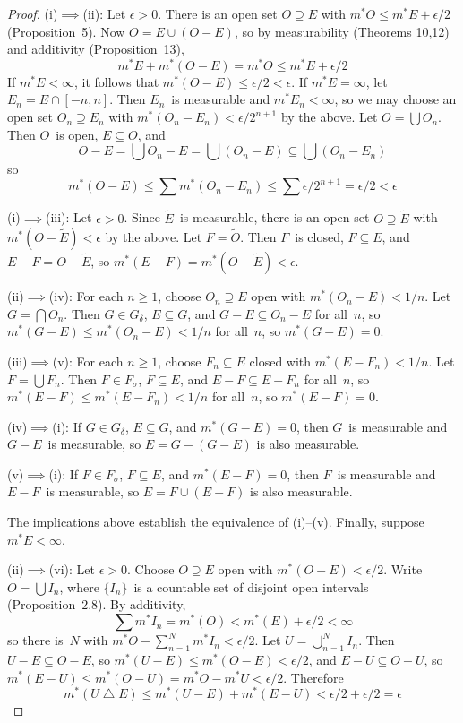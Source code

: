 \documentclass[letterpaper,12pt]{article}
\newcommand{\Gd}{G_{\delta}}
\newcommand{\Fs}{F_{\sigma}}
\newcommand{\union}{\cup}
\newcommand{\sect}{\cap}
\newcommand{\diff}{\bigtriangleup}
\newcommand{\bigunion}{\bigcup}
\newcommand{\bigsect}{\bigcap}
\newcommand{\mo}{m^*}
\newcommand{\comp}[1]{\widetilde{#1}}
\theoremstyle{plain}
\theoremstyle{definition}
\theoremstyle{remark}
\begin{document}
\begin{proof}
(i)\(\implies\)(ii): Let \(\epsilon>0\). There is an open set \(O\supseteq E\) with \(\mo O\le\mo E+\epsilon/2\) (Proposition~5). Now \(O=E\union(O-E)\), so by measurability (Theorems 10,12) and additivity (Proposition~13),
\[\mo E+\mo(O-E)=\mo O\le\mo E+\epsilon/2\]
If \(\mo E<\infty\), it follows that \(\mo(O-E)\le\epsilon/2<\epsilon\). If \(\mo E=\infty\), let \(E_n=E\sect[-n,n]\). Then \(E_n\)~is measurable and \(\mo E_n<\infty\), so we may choose an open set \(O_n\supseteq E_n\) with \(\mo(O_n-E_n)<\epsilon/2^{n+1}\) by the above. Let \(O=\bigunion O_n\). Then \(O\)~is open, \(E\subseteq O\), and
\[O-E=\bigunion O_n-E=\bigunion(O_n-E)\subseteq\bigunion(O_n-E_n)\]
so
\[\mo(O-E)\le\sum\mo(O_n-E_n)\le\sum\epsilon/2^{n+1}=\epsilon/2<\epsilon\]

(i)\(\implies\)(iii): Let \(\epsilon>0\). Since \(\comp{E}\)~is measurable, there is an open set \(O\supseteq\comp{E}\) with \(\mo(O-\comp{E})<\epsilon\) by the above. Let \(F=\comp{O}\). Then \(F\)~is closed, \(F\subseteq E\), and \(E-F=O-\comp{E}\), so \(\mo(E-F)=\mo(O-\comp{E})<\epsilon\).

(ii)\(\implies\)(iv): For each \(n\ge1\), choose \(O_n\supseteq E\) open with \(\mo(O_n-E)<1/n\). Let \(G=\bigsect O_n\). Then \(G\in\Gd\), \(E\subseteq G\), and \(G-E\subseteq O_n-E\) for all~\(n\), so \(\mo(G-E)\le\mo(O_n-E)<1/n\) for all~\(n\), so \(\mo(G-E)=0\).

(iii)\(\implies\)(v): For each \(n\ge1\), choose \(F_n\subseteq E\) closed with \(\mo(E-F_n)<1/n\). Let \(F=\bigunion F_n\). Then \(F\in\Fs\), \(F\subseteq E\), and \(E-F\subseteq E-F_n\) for all~\(n\), so \(\mo(E-F)\le\mo(E-F_n)<1/n\) for all~\(n\), so \(\mo(E-F)=0\).

(iv)\(\implies\)(i): If \(G\in\Gd\), \(E\subseteq G\), and \(\mo(G-E)=0\), then \(G\)~is measurable and \(G-E\)~is measurable, so \(E=G-(G-E)\) is also measurable.

(v)\(\implies\)(i): If \(F\in\Fs\), \(F\subseteq E\), and \(\mo(E-F)=0\), then \(F\)~is measurable and \(E-F\)~is measurable, so \(E=F\union(E-F)\) is also measurable.

The implications above establish the equivalence of (i)--(v). Finally, suppose \(\mo E<\infty\).

(ii)\(\implies\)(vi): Let \(\epsilon>0\). Choose \(O\supseteq E\) open with \(\mo(O-E)<\epsilon/2\). Write \(O=\bigunion I_n\), where \(\{I_n\}\)~is a countable set of disjoint open intervals (Proposition~2.8). By additivity,
\[\sum\mo I_n=\mo(O)<\mo(E)+\epsilon/2<\infty\]
so there is~\(N\) with \(\mo O-\sum_{n=1}^N\mo I_n<\epsilon/2\). Let \(U=\bigunion_{n=1}^N I_n\). Then \(U-E\subseteq O-E\), so \(\mo(U-E)\le\mo(O-E)<\epsilon/2\), and \(E-U\subseteq O-U\), so \(\mo(E-U)\le\mo(O-U)=\mo O-\mo U<\epsilon/2\). Therefore
\[\mo(U\diff E)\le\mo(U-E)+\mo(E-U)<\epsilon/2+\epsilon/2=\epsilon\]


\end{proof}
\end{document}
